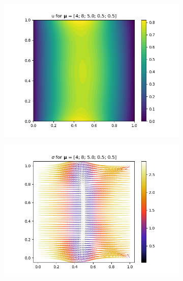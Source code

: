 \begin{figure}[!htb]
    \centering
    \begin{subfigure}{0.45\linewidth}
        \centering
        \includegraphics[width=\linewidth]{figs/mixed_u_mu12.png}
        \label{subfig:mu12_a}
    \end{subfigure}
    \begin{subfigure}{0.45\linewidth}
        \centering
        \includegraphics[width=\linewidth]{figs/mixed_sig_mu12.png}
        \label{subfig:mu12_b}
    \end{subfigure}
    \begin{subfigure}{0.45\linewidth}

\end{subfigure}
\end{figure}
